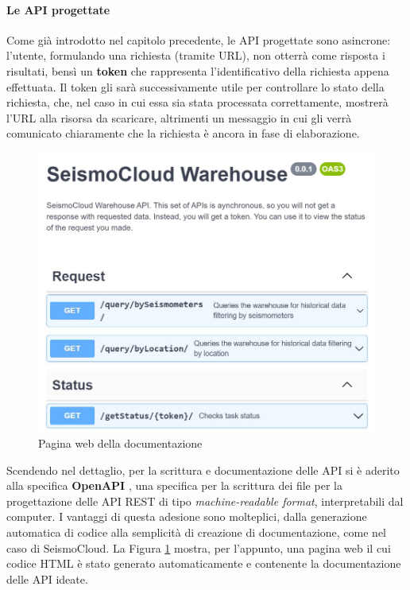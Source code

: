 \paragraph{Le API progettate} Come già introdotto nel capitolo precedente, le API progettate sono asincrone: l'utente, formulando una richiesta (tramite URL), non otterrà come risposta i risultati, bensì un \textbf{token} che rappresenta l'identificativo della richiesta appena effettuata. Il token gli sarà successivamente utile per controllare lo stato della richiesta, che, nel caso in cui essa sia stata processata correttamente, mostrerà l'URL alla risorsa da scaricare, altrimenti un messaggio in cui gli verrà comunicato chiaramente che la richiesta è ancora in fase di elaborazione.
\begin{figure}
    \includegraphics[scale=0.31]{images/openapi.jpg}
    \caption{Pagina web della documentazione}
    \label{fig:apiswagger}
\end{figure}
Scendendo nel dettaglio, per la scrittura e documentazione delle API si è aderito alla specifica \textbf{OpenAPI} \cite{openapi}, una specifica per la scrittura dei file per la progettazione delle API REST di tipo \textit{machine-readable format}, interpretabili dal computer. I vantaggi di questa adesione sono molteplici, dalla generazione automatica di codice alla semplicità di creazione di documentazione, come nel caso di SeismoCloud. La Figura \ref{fig:apiswagger} mostra, per l'appunto, una pagina web il cui codice HTML è stato generato automaticamente e contenente la documentazione delle API ideate.\\

